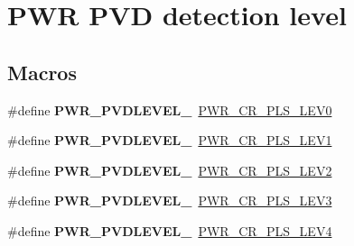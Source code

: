 \hypertarget{group___p_w_r___p_v_d__detection__level}{\section{P\-W\-R P\-V\-D detection level}
\label{group___p_w_r___p_v_d__detection__level}
}
\subsection*{Macros}
\begin{DoxyCompactItemize}
\item 
\hypertarget{group___p_w_r___p_v_d__detection__level_gaddf4616a143ac3481f3043f2a4c21c18}{\#define {\bfseries P\-W\-R\-\_\-\-P\-V\-D\-L\-E\-V\-E\-L\-\_}~\hyperlink{group___peripheral___registers___bits___definition_gacb6b904b20d7e4fff958c75748861216}{P\-W\-R\-\_\-\-C\-R\-\_\-\-P\-L\-S\-\_\-\-L\-E\-V0}}\label{group___p_w_r___p_v_d__detection__level_gaddf4616a143ac3481f3043f2a4c21c18}

\item 
\hypertarget{group___p_w_r___p_v_d__detection__level_ga06e55b20a8777594f1a91ee71fac1f79}{\#define {\bfseries P\-W\-R\-\_\-\-P\-V\-D\-L\-E\-V\-E\-L\-\_}~\hyperlink{group___peripheral___registers___bits___definition_ga15b71263f73f0c4e53ca91fc8d096818}{P\-W\-R\-\_\-\-C\-R\-\_\-\-P\-L\-S\-\_\-\-L\-E\-V1}}\label{group___p_w_r___p_v_d__detection__level_ga06e55b20a8777594f1a91ee71fac1f79}

\item 
\hypertarget{group___p_w_r___p_v_d__detection__level_gab26bb78650bbaef26ac9f9123c791cc7}{\#define {\bfseries P\-W\-R\-\_\-\-P\-V\-D\-L\-E\-V\-E\-L\-\_}~\hyperlink{group___peripheral___registers___bits___definition_ga2ea128abc2fc4252b53d09ca2850e69e}{P\-W\-R\-\_\-\-C\-R\-\_\-\-P\-L\-S\-\_\-\-L\-E\-V2}}\label{group___p_w_r___p_v_d__detection__level_gab26bb78650bbaef26ac9f9123c791cc7}

\item 
\hypertarget{group___p_w_r___p_v_d__detection__level_ga7b751743b3e29c237e6a0e1d7bdd0503}{\#define {\bfseries P\-W\-R\-\_\-\-P\-V\-D\-L\-E\-V\-E\-L\-\_}~\hyperlink{group___peripheral___registers___bits___definition_ga9c1782980a2fb12de80058729a74f174}{P\-W\-R\-\_\-\-C\-R\-\_\-\-P\-L\-S\-\_\-\-L\-E\-V3}}\label{group___p_w_r___p_v_d__detection__level_ga7b751743b3e29c237e6a0e1d7bdd0503}

\item 
\hypertarget{group___p_w_r___p_v_d__detection__level_ga03c0d3ae547deb1a51b8acafac101698}{\#define {\bfseries P\-W\-R\-\_\-\-P\-V\-D\-L\-E\-V\-E\-L\-\_}~\hyperlink{group___peripheral___registers___bits___definition_ga0fe79f097ea6c30a4ccf69ed3e177f85}{P\-W\-R\-\_\-\-C\-R\-\_\-\-P\-L\-S\-\_\-\-L\-E\-V4}}\label{group___p_w_r___p_v_d__detection__level_ga03c0d3ae547deb1a51b8acafac101698}


\end{DoxyCompactItemize}
